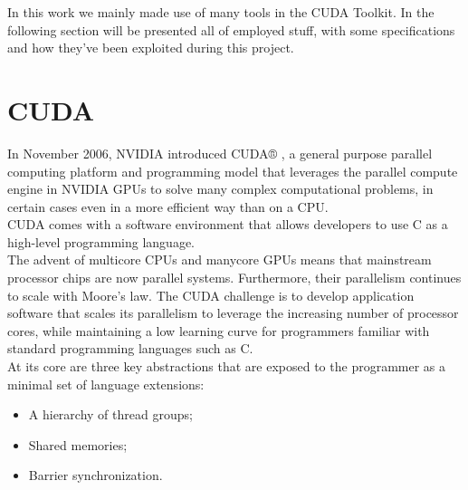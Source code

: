 

In this work we mainly made use of many tools in the CUDA Toolkit. In the following section will be presented all of employed stuff, with some specifications and how they've been exploited during this project.\\

\section{CUDA}
	In November 2006, NVIDIA introduced CUDA® , a general purpose parallel computing platform and programming model that leverages the parallel compute engine in NVIDIA GPUs to solve many complex computational problems, in certain cases even in a more efficient way than on a CPU.\\
	CUDA comes with a software environment that allows developers to use C as a high-level programming language. \\ 
	
	The advent of multicore CPUs and manycore GPUs means that mainstream processor chips are now parallel systems. Furthermore, their parallelism continues to scale with Moore's law. The CUDA challenge is to develop application software that scales its parallelism to leverage the increasing number of processor cores, while maintaining a low learning curve for programmers familiar with standard programming languages such as C.\\
	
	At its core are three key abstractions that are exposed to the programmer as a minimal
	set of language extensions:\\
	\begin{itemize}
		\item A hierarchy of thread groups;
		
		\item Shared memories;
		
		\item Barrier synchronization.
	\end{itemize} 
	
